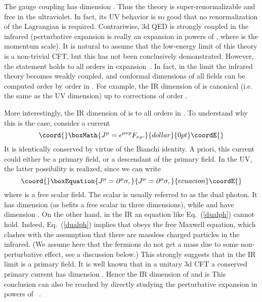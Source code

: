 \documentclass[a4paper,12pt, amsfonts, amssymb]{article}
\providecommand{\ra}{\rightarrow}
\providecommand{\eps}{\epsilon}
\begin{document}
The gauge coupling \coordHE{} has dimension \coordHE{}. Thus the theory is
super-renormalizable and free in the ultraviolet. In fact, its UV
behavior is so good that no renormalization of the Lagrangian is required.
Contrariwise, 3d QED is strongly coupled in the infrared (perturbative
expansion is really an expansion in powers of \coordHE{}, where \coordHE{} is
the momentum scale).
It is natural to assume that the
low-energy limit of this theory is a non-trivial CFT, but this has not
been conclusively demonstrated. However, the statement holds
to all orders in \coordHE{} expansion~\cite{AP,JT,Templeton,AH}. 
In fact, in the limit 
\myHighlight{$N_f\ra\infty$}\coordHE{} the infrared theory becomes weakly coupled, and
conformal dimensions of all fields can be computed order by order 
in \coordHE{}. For example, the IR dimension of \coordHE{} is 
canonical (i.e. the same as the UV dimension) up to corrections of 
order \coordHE{}. 

More interestingly,
the IR dimension of \coordHE{} is \coordHE{} to all orders in \coordHE{}.
To understand why this is the case, consider a current
$$\coord{}\boxMath{
J^\mu=\eps^{\mu\nu\rho} F_{\nu\rho}.
}{dollar}{0pt}\coordE{}$$
It is identically conserved by virtue of the Bianchi identity.
A priori, this current could either be a primary field, or a descendant
of the primary field. In the UV, the latter possibility is realized,
since we can write 
\begin{equation}\coord{}\boxEquation{\label{dualph}
J^\mu=\partial^\mu \sigma,
}{J^\mu=\partial^\mu \sigma,
}{ecuacion}\coordE{}\end{equation}
where \myHighlight{$\sigma$}\coordHE{} is a free scalar field. The scalar \myHighlight{$\sigma$}\coordHE{} is usually
referred to as the dual photon. It has dimension \coordHE{} (as befits a free scalar in three dimensions), while \coordHE{} and \coordHE{} have dimension \coordHE{}. 
On the
other hand, in the IR an equation like Eq.~(\ref{dualph}) cannot hold.
Indeed, Eq.~(\ref{dualph}) implies that \coordHE{} obeys the free Maxwell equation, which clashes with the assumption that there are massless charged particles in the infrared. (We assume here that the fermions do not get a mass due to some non-perturbative effect, see a discussion below.) 
This strongly suggests that in the IR limit \coordHE{} is a primary field. 
It is well known that 
in a unitary 3d CFT a conserved primary current has dimension \coordHE{}. 
Hence the IR dimension of \coordHE{} and \coordHE{} is \coordHE{} 
This conclusion can also
be reached by directly studying the perturbative expansion in powers 
of \coordHE{}~\cite{AH}. 
\end{document}
